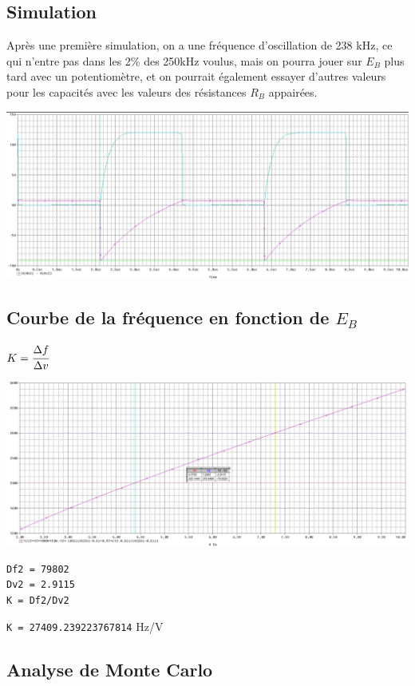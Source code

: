 \subsection{Simulation}

Après une première simulation, on a une fréquence d’oscillation de 238 kHz, ce qui n’entre pas dans les 2\% des 250kHz voulus, mais on pourra jouer sur $E_B$ plus tard avec un potentiomètre, et on pourrait également essayer d’autres valeurs pour les capacités avec les valeurs des résistances $R_B$ appairées.

\includegraphics[width=\linewidth]{../img/oscillations_vco.png}

\subsection{Courbe de la fréquence en fonction de $E_B$}

$K = \cfrac{\Delta f}{\Delta v}$

\includegraphics[width=\linewidth]{../img/variation_freq_vco.png}

\begin{verbatim}
Df2 = 79802
Dv2 = 2.9115
K = Df2/Dv2
\end{verbatim}
\verb|K = 27409.239223767814| \si{\Hz/\V}
\subsection{Analyse de Monte Carlo}

